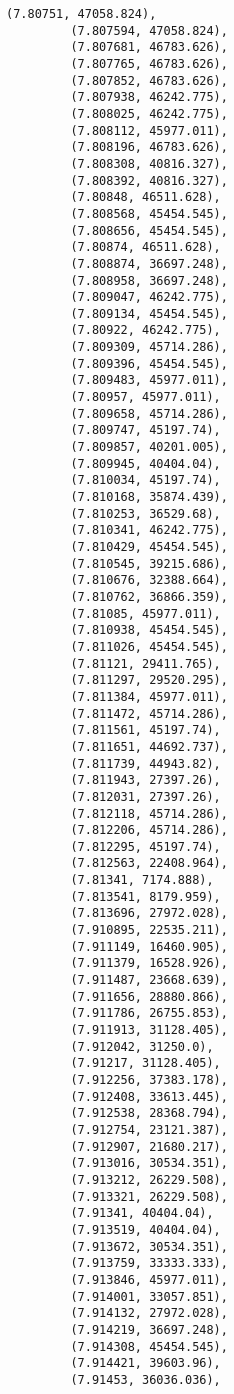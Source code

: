 \documentclass[11pt]{article}
\begin{document}
\begin{Verbatim}[commandchars=\\\{\}]
         (7.80751, 47058.824),
         (7.807594, 47058.824),
         (7.807681, 46783.626),
         (7.807765, 46783.626),
         (7.807852, 46783.626),
         (7.807938, 46242.775),
         (7.808025, 46242.775),
         (7.808112, 45977.011),
         (7.808196, 46783.626),
         (7.808308, 40816.327),
         (7.808392, 40816.327),
         (7.80848, 46511.628),
         (7.808568, 45454.545),
         (7.808656, 45454.545),
         (7.80874, 46511.628),
         (7.808874, 36697.248),
         (7.808958, 36697.248),
         (7.809047, 46242.775),
         (7.809134, 45454.545),
         (7.80922, 46242.775),
         (7.809309, 45714.286),
         (7.809396, 45454.545),
         (7.809483, 45977.011),
         (7.80957, 45977.011),
         (7.809658, 45714.286),
         (7.809747, 45197.74),
         (7.809857, 40201.005),
         (7.809945, 40404.04),
         (7.810034, 45197.74),
         (7.810168, 35874.439),
         (7.810253, 36529.68),
         (7.810341, 46242.775),
         (7.810429, 45454.545),
         (7.810545, 39215.686),
         (7.810676, 32388.664),
         (7.810762, 36866.359),
         (7.81085, 45977.011),
         (7.810938, 45454.545),
         (7.811026, 45454.545),
         (7.81121, 29411.765),
         (7.811297, 29520.295),
         (7.811384, 45977.011),
         (7.811472, 45714.286),
         (7.811561, 45197.74),
         (7.811651, 44692.737),
         (7.811739, 44943.82),
         (7.811943, 27397.26),
         (7.812031, 27397.26),
         (7.812118, 45714.286),
         (7.812206, 45714.286),
         (7.812295, 45197.74),
         (7.812563, 22408.964),
         (7.81341, 7174.888),
         (7.813541, 8179.959),
         (7.813696, 27972.028),
         (7.910895, 22535.211),
         (7.911149, 16460.905),
         (7.911379, 16528.926),
         (7.911487, 23668.639),
         (7.911656, 28880.866),
         (7.911786, 26755.853),
         (7.911913, 31128.405),
         (7.912042, 31250.0),
         (7.91217, 31128.405),
         (7.912256, 37383.178),
         (7.912408, 33613.445),
         (7.912538, 28368.794),
         (7.912754, 23121.387),
         (7.912907, 21680.217),
         (7.913016, 30534.351),
         (7.913212, 26229.508),
         (7.913321, 26229.508),
         (7.91341, 40404.04),
         (7.913519, 40404.04),
         (7.913672, 30534.351),
         (7.913759, 33333.333),
         (7.913846, 45977.011),
         (7.914001, 33057.851),
         (7.914132, 27972.028),
         (7.914219, 36697.248),
         (7.914308, 45454.545),
         (7.914421, 39603.96),
         (7.91453, 36036.036),

\end{Verbatim}
\end{document}
